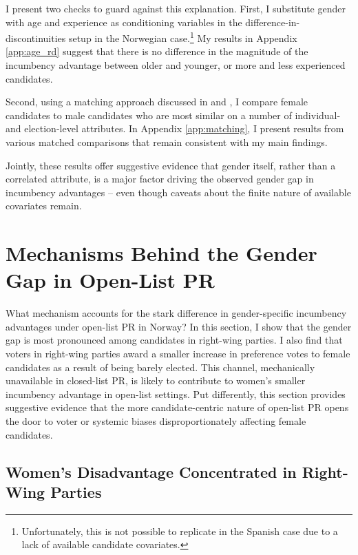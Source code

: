 \documentclass[12pt]{article}
\begin{document}
I present two checks to guard against this explanation. First, I substitute gender with age and experience as conditioning variables in the difference-in-discontinuities setup in the Norwegian case.\footnote{Unfortunately, this is not possible to replicate in the Spanish case due to a lack of available candidate covariates.} My results in Appendix \ref{app:age_rd} suggest that there is no difference in the magnitude of the incumbency advantage between older and younger, or more and less experienced candidates.

Second, using a matching approach discussed in \citet{bansak2021} and \citet{bansak2022}, I compare female candidates to male candidates who are most similar on a number of individual- and election-level attributes. In Appendix \ref{app:matching}, I present results from various matched comparisons that remain consistent with my main findings.

Jointly, these results offer suggestive evidence that gender itself, rather than a correlated attribute, is a major factor driving the observed gender gap in incumbency advantages -- even though caveats about the finite nature of available covariates remain.


\section{Mechanisms Behind the Gender Gap in Open-List PR}

What mechanism accounts for the stark difference in gender-specific incumbency advantages under open-list PR in Norway? In this section, I show that the gender gap is most pronounced among candidates in right-wing parties. I also find that voters in right-wing parties award a smaller increase in preference votes to female candidates as a result of being barely elected. This channel, mechanically unavailable in closed-list PR, is likely to contribute to women's smaller incumbency advantage in open-list settings. Put differently, this section provides suggestive evidence that the more candidate-centric nature of open-list PR opens the door to voter or systemic biases disproportionately affecting female candidates.

\subsection{Women's Disadvantage Concentrated in Right-Wing Parties}
\end{document}
